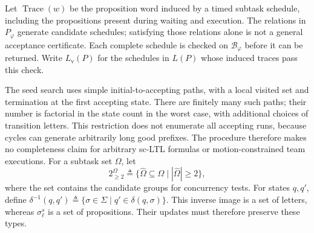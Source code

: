 \begin{revision}
Let $\operatorname{Trace}(w)$ be the proposition word induced by a timed
subtask schedule, including the propositions present during waiting and
execution. The relations in $P_\varphi$ generate candidate schedules;
satisfying those relations alone is not a general acceptance certificate.
Each complete schedule is checked on $\mathcal{B}_\varphi$ before it can
be returned. Write $L_{\mathrm{v}}(P)$ for the schedules in $L(P)$ whose
induced traces pass this check.

The seed search uses simple initial-to-accepting paths, with a local visited
set and termination at the first accepting state. There are finitely many
such paths; their number is factorial in the state count in the worst case,
with additional choices of transition letters. This restriction does not
enumerate all accepting runs, because cycles can generate arbitrarily long
good prefixes. The procedure therefore makes no completeness claim for
arbitrary sc-LTL formulas or motion-constrained team executions.
For a subtask set $\Omega$, let
\[
2_{\ge2}^{\Omega}\triangleq
\{\widehat\Omega\subseteq\Omega\mid |\widehat\Omega|\ge2\},
\]
where the set contains the candidate groups for concurrency tests.
For states $q,q'$, define
$\delta^{-1}(q,q')\triangleq
\{\sigma\in\Sigma\mid q'\in\delta(q,\sigma)\}$.
This inverse image is a set of letters, whereas $\sigma_\ell^s$ is a set
of propositions. Their updates must therefore preserve these types.
\end{revision}

